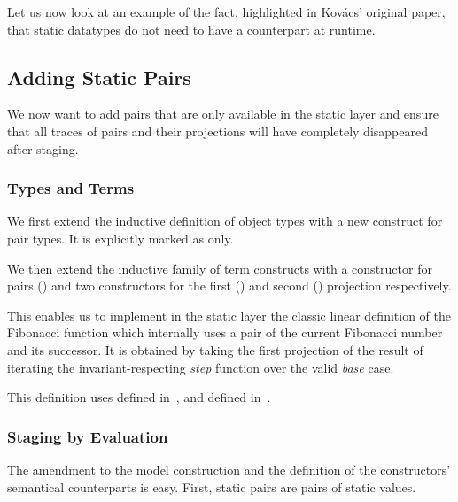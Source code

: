 Let us now look at an example of the fact, highlighted in
Kov{\'{a}}cs' original paper, that static datatypes do not
need to have a counterpart at runtime.

\subsection{Adding Static Pairs}\label{sec:stagingmodelprod}

We now want to add pairs that are only available in the static
layer and ensure that all traces of pairs and their projections
will have completely disappeared after staging.

\subsubsection{Types and Terms}

We first extend the inductive definition of object types
with a new construct for pair types. It is explicitly
marked as  only.


We then extend the inductive family of term constructs
with a constructor for pairs () and two constructors
for the first () and second () projection
respectively.


This enables us to implement in the static layer the classic
linear definition of the Fibonacci function which internally
uses a pair of the current Fibonacci number and its successor.
%
It is obtained by taking the first projection of the result
of iterating the invariant-respecting \emph{step} function
over the valid \emph{base} case.


This definition uses  defined in~,
and  defined in~.

\subsubsection{Staging by Evaluation}

The amendment to the model construction and the definition of the
constructors' semantical counterparts is easy.
%
First, static pairs are pairs of static values.


